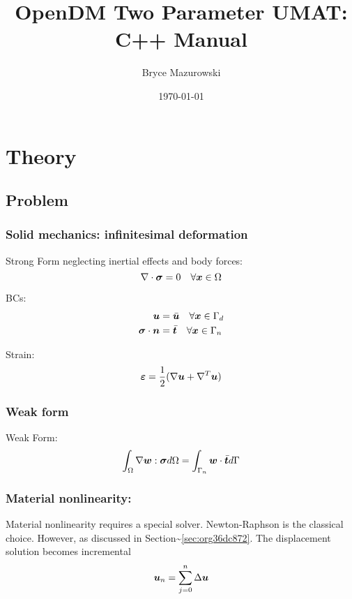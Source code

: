 \documentclass[11pt]{article}
\author{Bryce Mazurowski}
\date{\today}
\title{OpenDM Two Parameter UMAT: C++ Manual}
\begin{document}
\maketitle

\section{Theory}
\label{sec:orgdf29f96}
\subsection{Problem}
\label{sec:org8530420}
\subsubsection{Solid mechanics: infinitesimal deformation}
\label{sec:org5b776cb}
Strong Form neglecting inertial effects and body forces:
\begin{equation}
  \nabla \cdot \bm{\sigma} = 0 \quad \forall \bm{x} \in \Omega
\end{equation}

BCs:
\begin{equation}
  \begin{split}
    \bm{u} &= \bar{\bm{u}} \quad \forall \bm{x} \in \Gamma_d \\
    \bm{\sigma} \cdot \bm{n} &= \bar{\bm{t}}
    \quad \forall \bm{x} \in \Gamma_n \\
  \end{split}
\end{equation}

Strain:
\[
\bm{\varepsilon} = \frac{1}{2}(\nabla \bm{u} + \nabla^T \bm{u})
\]

\subsubsection{Weak form}
\label{sec:org3927006}
Weak Form:
\[
\int_{\Omega} \nabla \bm{w} : \bm{\sigma} d\Omega =
\int_{\Gamma_n} \bm{w} \cdot \bar{\bm{t}} d\Gamma
\]

\subsubsection{Material nonlinearity:}
\label{sec:orgeadafd3}
Material nonlinearity requires a special solver. Newton-Raphson is the
classical choice. However, as discussed in Section\textasciitilde{}\ref{sec:org36dc872}. The displacement solution becomes incremental
\[
\bm{u}_n = \sum_{j=0}^{n} \Delta \bm{u}
\]
\end{document}
